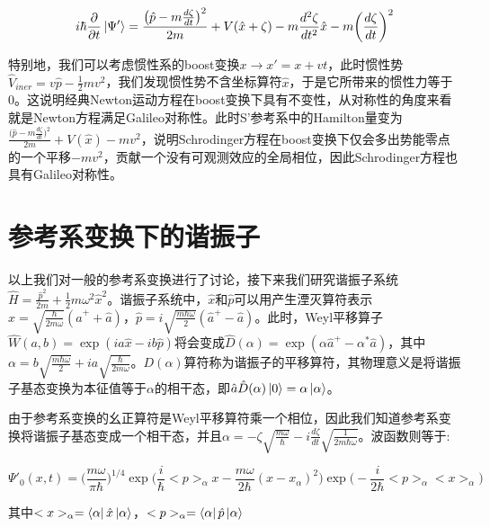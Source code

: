 \documentclass[a4paper]{article}
\begin{document}
        \begin{equation}
            i\hbar\frac{\partial}{\partial t}\ket{\Psi'} = \frac{\big(\hat{p}-m\frac{d\zeta}{dt}\big)^2}{2m} + V(\hat{x}+\zeta) - m \frac{d^2\zeta}{d t^2}\hat{x} - m\bigg(\frac{d\zeta}{dt}\bigg)^2
        \end{equation}

        特别地，我们可以考虑惯性系的boost变换$x\rightarrow x'=x+vt$，此时惯性势$\hat{V}_{iner}=v\hat{p}-\frac{1}{2}mv^2$，我们发现惯性势不含坐标算符$\hat{x}$，于是它所带来的惯性力等于0。这说明经典Newton运动方程在boost变换下具有不变性，从对称性的角度来看就是Newton方程满足Galileo对称性。此时S'参考系中的Hamilton量变为$\frac{\big(\hat{p}-m\frac{d\zeta}{dt}\big)^2}{2m}+V(\hat{x})-mv^2$，说明Schrodinger方程在boost变换下仅会多出势能零点的一个平移$-mv^2$，贡献一个没有可观测效应的全局相位，因此Schrodinger方程也具有Galileo对称性。
        


    \section{参考系变换下的谐振子}

        以上我们对一般的参考系变换进行了讨论，接下来我们研究谐振子系统$\hat{H}=\frac{\hat{p}^2}{2m}+\frac{1}{2}m\omega^2\hat{x}^2$。谐振子系统中，$\hat{x}$和$\hat{p}$可以用产生湮灭算符表示$\hat{x}=\sqrt{\frac{\hbar}{2m\omega}}(\hat{a}^{+}+\hat{a})$，$\hat{p}=i\sqrt{\frac{m\hbar\omega}{2}}(\hat{a}^{+}-\hat{a})$。此时，Weyl平移算子$\hat{W}(a, b)=\exp(ia\hat{x}-ib\hat{p})$将会变成$\hat{D}(\alpha)=\exp(\alpha\hat{a}^{+}-\alpha^*\hat{a})$，其中$\alpha=b\sqrt{\frac{m\hbar\omega}{2}}+ia\sqrt{\frac{\hbar}{2m\omega}}$。$D(\alpha)$算符称为谐振子的平移算符，其物理意义是将谐振子基态变换为本征值等于$\alpha$的相干态，即$\hat{a}\hat{D}(\alpha)\ket{0}=\alpha\ket{\alpha}$。

        由于参考系变换的幺正算符是Weyl平移算符乘一个相位，因此我们知道参考系变换将谐振子基态变成一个相干态，并且$\alpha=-\zeta\sqrt{\frac{m\omega}{\hbar}}-i\frac{d\zeta}{dt}\sqrt{\frac{1}{2m\hbar\omega}}$。波函数则等于:

        \begin{equation}
            \Psi'_0(x,t) = \bigg(\frac{m\omega}{\pi\hbar}\bigg)^{1/4} \exp\bigg(\frac{i}{\hbar}<p>_\alpha x-\frac{m\omega}{2\hbar}(x-x_\alpha)^2\bigg)\exp\bigg(-\frac{i}{2\hbar}<p>_\alpha<x>_\alpha\bigg)
        \end{equation}

        其中$<x>_\alpha=\bra{\alpha}\hat{x}\ket{\alpha}$，$<p>_\alpha=\Bra{\alpha}\hat{p}\ket{\alpha}$
\end{document}
